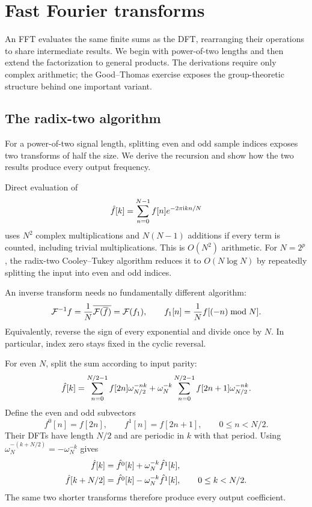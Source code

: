 \section{Fast Fourier transforms}
\label{sect1-transform-fast}
An FFT evaluates the same finite sums as the DFT, rearranging their operations
to share intermediate results. We begin with power-of-two lengths and then
extend the factorization to general products. The derivations require only
complex arithmetic; the Good--Thomas exercise exposes the group-theoretic
structure behind one important variant.

\subsection{The radix-two algorithm}
\label{sect2-present-algo-fft}

For a power-of-two signal length, splitting even and odd sample indices
exposes two transforms of half the size. We derive the recursion and show
how the two results produce every output frequency.

Direct evaluation of
\begin{equation}
\label{eq-calcul-direct-tfd}
 \hat{f}[k]=\sum_{n=0}^{N-1}f[n]e^{-2\pi\mathrm{i} kn/N}
\end{equation}
uses $N^2$ complex multiplications and $N(N-1)$ additions if every term is
counted, including trivial multiplications. This is $O(N^2)$ arithmetic.
For $N=2^p$, the radix-two Cooley--Tukey algorithm reduces it to
$O(N\log N)$ by repeatedly splitting the input into even and odd indices.

An inverse transform needs no fundamentally different algorithm:
\[
 \mathcal{F}^{-1}f=\frac1N\overline{\mathcal{F}(\overline{f})}
          =\mathcal{F}(f_1),\qquad f_1[n]=\frac1Nf[(-n)\bmod N].
\]
Equivalently, reverse the sign of every exponential and divide once by $N$.
In particular, index zero stays fixed in the cyclic reversal.

For even $N$, split the sum according to input parity:
\begin{equation}
\label{eq-fft-dif}
 \hat{f}[k]=\sum_{n=0}^{N/2-1}f[2n]\omega_{N/2}^{-nk}
          +\omega_N^{-k}\sum_{n=0}^{N/2-1}f[2n+1]\omega_{N/2}^{-nk}.
\end{equation}
Define the even and odd subvectors
\begin{equation}
\label{eq-part-even-odd}
 f^0[n]=f[2n],\qquad f^1[n]=f[2n+1],\qquad 0\leq n<N/2.
\end{equation}
\label{notation-44}
Their DFTs have length $N/2$ and are periodic in $k$ with that period.
Using $\omega_N^{-(k+N/2)}=-\omega_N^{-k}$ gives
\begin{align}
\label{eq-danielson-lanczos-1}
 \hat{f}[k]&=\hat{f^0}[k]+\omega_N^{-k}\hat{f^1}[k],\\
\label{eq-danielson-lanczos-2}
 \hat{f}[k+N/2]&=\hat{f^0}[k]-\omega_N^{-k}\hat{f^1}[k],
 \qquad 0\leq k<N/2.
\end{align}
The same two shorter transforms therefore produce every output coefficient.

